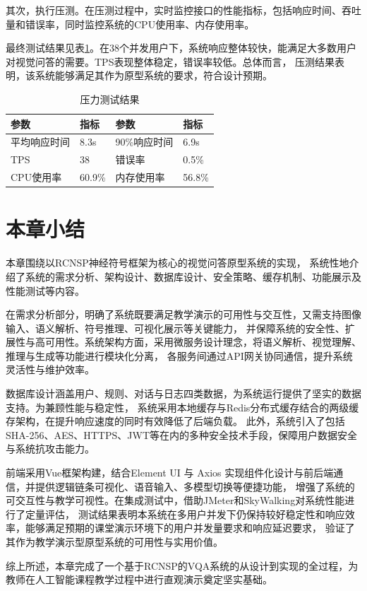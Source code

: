 其次，执行压测。在压测过程中，实时监控接口的性能指标，包括响应时间、吞吐量和错误率，同时监控系统的CPU使用率、内存使用率。

最终测试结果见表\ref{tab:test_result}。在38个并发用户下，系统响应整体较快，能满足大多数用户对视觉问答的需要。TPS表现整体稳定，错误率较低。总体而言，
压测结果表明，该系统能够满足其作为原型系统的要求，符合设计预期。
\begin{table}[h]
    \centering
    \renewcommand{\arraystretch}{1.3} %
    \begin{tabular}{|l|l|l|l|}
        \hline
        \textbf{参数} & \textbf{指标} & \textbf{参数} & \textbf{指标} \\
        \hline
        平均响应时间 & 8.3s & 90\%响应时间 & 6.9s \\
        \hline
        TPS & 38 & 错误率 & 0.5\% \\
        \hline
        CPU使用率 & 60.9\% & 内存使用率 & 56.8\% \\
        \hline
    \end{tabular}
    \caption{压力测试结果}
    \label{tab:test_result}
\end{table}
\section{本章小结}
本章围绕以RCNSP神经符号框架为核心的视觉问答原型系统的实现，
系统性地介绍了系统的需求分析、架构设计、数据库设计、安全策略、缓存机制、功能展示及性能测试等内容。

在需求分析部分，明确了系统既要满足教学演示的可用性与交互性，又需支持图像输入、语义解析、符号推理、可视化展示等关键能力，
并保障系统的安全性、扩展性与高可用性。系统架构方面，采用微服务设计理念，将语义解析、视觉理解、推理与生成等功能进行模块化分离，
各服务间通过API网关协同通信，提升系统灵活性与维护效率。

数据库设计涵盖用户、规则、对话与日志四类数据，为系统运行提供了坚实的数据支持。为兼顾性能与稳定性，
系统采用本地缓存与Redis分布式缓存结合的两级缓存架构，在提升响应速度的同时有效降低了后端负载。
此外，系统引入了包括SHA-256、AES、HTTPS、JWT等在内的多种安全技术手段，保障用户数据安全与系统抗攻击能力。

前端采用Vue框架构建，结合Element UI 与 Axios 实现组件化设计与前后端通信，并提供逻辑链条可视化、语音输入、多模型切换等便捷功能，
增强了系统的可交互性与教学可视性。在集成测试中，借助JMeter和SkyWalking对系统性能进行了定量评估，
测试结果表明本系统在多用户并发下仍保持较好稳定性和响应效率，能够满足预期的课堂演示环境下的用户并发量要求和响应延迟要求，
验证了其作为教学演示型原型系统的可用性与实用价值。

综上所述，本章完成了一个基于RCNSP的VQA系统的从设计到实现的全过程，为教师在人工智能课程教学过程中进行直观演示奠定坚实基础。